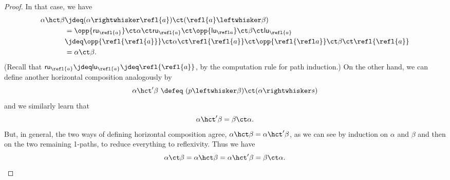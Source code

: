 \begin{proof}
In that case, we have
\begin{align*}
  \alpha\hct\beta
  &\jdeq (\alpha\rightwhisker\refl{a}) \ct (\refl{a}\leftwhisker \beta)\\
  &= \opp{\mathsf{ru}_{\refl{a}}} \ct \alpha \ct \mathsf{ru}_{\refl{a}} \ct \opp{\mathsf{lu}_{\refl a}} \ct \beta \ct \mathsf{lu}_{\refl{a}}\\
  &\jdeq \opp{\refl{\refl{a}}} \ct \alpha \ct \refl{\refl{a}} \ct \opp{\refl{\refl a}} \ct \beta \ct \refl{\refl{a}}\\
  &= \alpha \ct \beta.
\end{align*}
(Recall that $\mathsf{ru}_{\refl{a}} \jdeq \mathsf{lu}_{\refl{a}} \jdeq \refl{\refl{a}}$, by the computation rule for path induction.)
On the other hand, we can define another horizontal composition analogously by
\[
\alpha\hct'\beta\ \defeq\ (p\leftwhisker \beta)\ct (\alpha\rightwhisker s)
\]
and we similarly learn that
\[
\alpha\hct'\beta = \beta\ct\alpha.
\]
%
But, in general, the two ways of defining horizontal composition agree, $\alpha\hct\beta = \alpha\hct'\beta$, as we can see by induction on $\alpha$ and $\beta$ and then on the two remaining 1-paths, to reduce everything to reflexivity.
Thus we have
\[\alpha \ct \beta = \alpha\hct\beta = \alpha\hct'\beta = \beta\ct\alpha.
\qedhere
\]
\end{proof}
